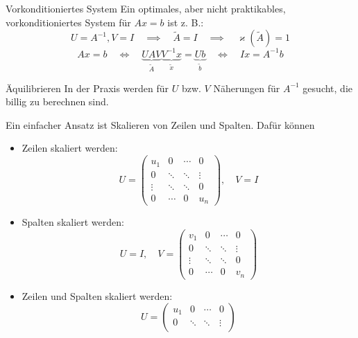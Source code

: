 \begin{example}{Vorkonditioniertes System}
    Ein optimales, aber nicht praktikables, vorkonditioniertes System für $Ax = b$ ist z. B.:
    \[
        U = A^{-1}, V = I \quad \implies \quad \tilde{A} = I \quad \implies \quad \varkappa(\tilde{A}) = 1
    \]
    \[
        Ax = b \quad \iff \quad \underbrace{UAV}_{\tilde{A}} \underbrace{V^{-1}x}_{\tilde{x}} = \underbrace{Ub}_{\tilde{b}} \quad \iff \quad I x = A^{-1} b
    \]
\end{example}

\begin{bonus}{Äquilibrieren}
    In der Praxis werden für $U$ bzw. $V$ Näherungen für $A^{-1}$ gesucht, die billig zu berechnen sind.
    
    Ein einfacher Ansatz ist Skalieren von Zeilen und Spalten.
    Dafür können
    \begin{itemize}
        \item Zeilen skaliert werden:
              \[
                  U =
                  \begin{pmatrix}
                      u_1    & 0      & \cdots & 0      \\
                      0      & \ddots & \ddots & \vdots \\
                      \vdots & \ddots & \ddots & 0      \\
                      0      & \cdots & 0      & u_n
                  \end{pmatrix},
                  \quad V = I
              \]
        \item Spalten skaliert werden:
              \[
                  U = I,
                  \quad V =
                  \begin{pmatrix}
                      v_1    & 0      & \cdots & 0      \\
                      0      & \ddots & \ddots & \vdots \\
                      \vdots & \ddots & \ddots & 0      \\
                      0      & \cdots & 0      & v_n
                  \end{pmatrix}
              \]
        \item Zeilen und Spalten skaliert werden:
              \[
                  U =
                  \begin{pmatrix}
                      u_1    & 0      & \cdots & 0      \\
                      0      & \ddots & \ddots & \vdots \\

\end{pmatrix}\]
\end{itemize}
\end{bonus}

